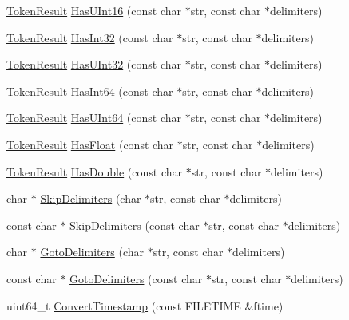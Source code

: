 \begin{DoxyCompactItemize}
\item 
\hyperlink{namespacemage_a2178ba2411db5912f41b2e7698c2037d}{Token\+Result} \hyperlink{namespacemage_a1dd9c4b40b7b0e084a3014f8fd9f26ca}{Has\+U\+Int16} (const char $\ast$str, const char $\ast$delimiters)
\item 
\hyperlink{namespacemage_a2178ba2411db5912f41b2e7698c2037d}{Token\+Result} \hyperlink{namespacemage_a78f76aec12a47505136e00224e4bf9ce}{Has\+Int32} (const char $\ast$str, const char $\ast$delimiters)
\item 
\hyperlink{namespacemage_a2178ba2411db5912f41b2e7698c2037d}{Token\+Result} \hyperlink{namespacemage_a2b7625293b098b935d6fe3b251573018}{Has\+U\+Int32} (const char $\ast$str, const char $\ast$delimiters)
\item 
\hyperlink{namespacemage_a2178ba2411db5912f41b2e7698c2037d}{Token\+Result} \hyperlink{namespacemage_a59d8d6302b2f0cd017dfa2217ac536b0}{Has\+Int64} (const char $\ast$str, const char $\ast$delimiters)
\item 
\hyperlink{namespacemage_a2178ba2411db5912f41b2e7698c2037d}{Token\+Result} \hyperlink{namespacemage_a49b54d6a4244d71dc63237ead3a6307e}{Has\+U\+Int64} (const char $\ast$str, const char $\ast$delimiters)
\item 
\hyperlink{namespacemage_a2178ba2411db5912f41b2e7698c2037d}{Token\+Result} \hyperlink{namespacemage_a8ebb1c7757b2869a4d3dc3c60c3a836d}{Has\+Float} (const char $\ast$str, const char $\ast$delimiters)
\item 
\hyperlink{namespacemage_a2178ba2411db5912f41b2e7698c2037d}{Token\+Result} \hyperlink{namespacemage_ac039d6b5a481b26e7440672a75ad70df}{Has\+Double} (const char $\ast$str, const char $\ast$delimiters)
\item 
char $\ast$ \hyperlink{namespacemage_a0a49375006b3808200d86271f62dbbc2}{Skip\+Delimiters} (char $\ast$str, const char $\ast$delimiters)
\item 
const char $\ast$ \hyperlink{namespacemage_acd903800f144d88982aa559730b9a165}{Skip\+Delimiters} (const char $\ast$str, const char $\ast$delimiters)
\item 
char $\ast$ \hyperlink{namespacemage_a1f8c73ddfbe8a370be1800627136b2ca}{Goto\+Delimiters} (char $\ast$str, const char $\ast$delimiters)
\item 
const char $\ast$ \hyperlink{namespacemage_a3cbc104feb30a9abd8dcec1a77b918b0}{Goto\+Delimiters} (const char $\ast$str, const char $\ast$delimiters)
\item 
uint64\+\_\+t \hyperlink{namespacemage_a75f2f48306b962f530412769c6187aa5}{Convert\+Timestamp} (const F\+I\+L\+E\+T\+I\+ME \&ftime)

\end{DoxyCompactItemize}
